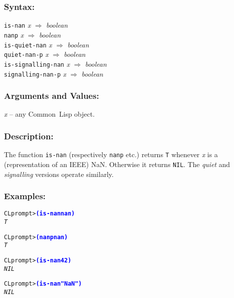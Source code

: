 \documentclass[10pt,fleqn]{article}
\newcommand{\CL}{\textsf{Common~Lisp}}
\newcommand{\code}[1]{\texttt{#1}}
\newcommand{\varname}[1]{\textit{#1}}
\newcommand{\codeprompt}[1]{\textcolor{blue}{\textbf{#1}}}
\newcommand{\DSyntax}{\subsubsection*{Syntax:}}
\newcommand{\DArgsNValues}{\subsubsection*{Arguments and Values:}}
\newcommand{\DDescription}{\subsubsection*{Description:}}
\newcommand{\DExamples}{\subsubsection*{Examples:}}
\begin{document}
\DSyntax{}

\code{is-nan} \varname{x} $\Rightarrow$ \textit{boolean}\\
\code{nanp} \varname{x} $\Rightarrow$ \textit{boolean}\\
\code{is-quiet-nan} \varname{x} $\Rightarrow$ \textit{boolean}\\
\code{quiet-nan-p} \varname{x} $\Rightarrow$ \textit{boolean}\\
\code{is-signalling-nan} \varname{x} $\Rightarrow$ \textit{boolean}\\
\code{signalling-nan-p} \varname{x} $\Rightarrow$ \textit{boolean}\\

\DArgsNValues{}

\varname{x} -- any \CL{} object.

\DDescription{}

The function \code{is-nan} (respectively \code{nanp} etc.) returns \code{T}
whenever \varname{x} is a (representation of an IEEE) NaN.  Otherwise
it returns \code{NIL}. The \emph{quiet} and \emph{signalling} versions
operate similarly.

\DExamples{}

\begin{alltt}
CL prompt> \codeprompt{(is-nan nan)}
\textit{T}

CL prompt> \codeprompt{(nanp nan)}
\textit{T}

CL prompt> \codeprompt{(is-nan 42)}
\textit{NIL}

CL prompt> \codeprompt{(is-nan "NaN")}
\textit{NIL}
\end{alltt}
\end{document}
